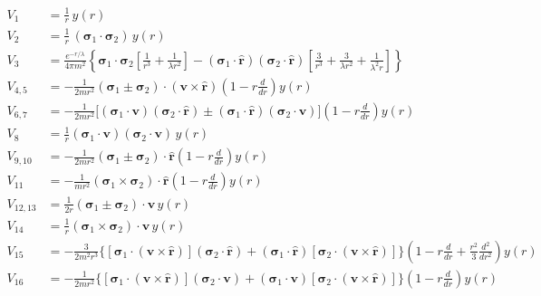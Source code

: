 {\small
\begin{align}
  V_1 &= \frac1r\,y(r) \label{eq:v1}\\
  V_2 &= \frac1r\,(\boldsymbol\sigma_1\cdot\boldsymbol\sigma_2)\,y(r) \label{eq:v2}\\
  V_3 &= \frac{e^{-r/\lambda}}{4\pi m^2}\left\{\boldsymbol\sigma_1\cdot\boldsymbol\sigma_2
    \left[\frac1{r^3}+\frac1{\lambda r^2}\right]
    -(\boldsymbol\sigma_1\cdot\hat{\mathbf r})(\boldsymbol\sigma_2\cdot\hat{\mathbf r})
    \left[\frac3{r^3}+\frac3{\lambda r^2}+\frac1{\lambda^2r}\right]\right\} \label{eq:v3}\\
  V_{4,5} &= -\frac{1}{2mr^2}(\boldsymbol\sigma_1\pm\boldsymbol\sigma_2)\cdot(\mathbf v\times\hat{\mathbf r})
    \left(1-r\frac{d}{dr}\right)y(r) \label{eq:v45}\\
  V_{6,7} &= -\frac{1}{2mr^2}\Big[(\boldsymbol\sigma_1\cdot\mathbf v)(\boldsymbol\sigma_2\cdot\hat{\mathbf r})
    \pm(\boldsymbol\sigma_1\cdot\hat{\mathbf r})(\boldsymbol\sigma_2\cdot\mathbf v)\Big]
    \left(1-r\frac{d}{dr}\right)y(r) \label{eq:v67}\\
  V_8 &= \frac1r(\boldsymbol\sigma_1\cdot\mathbf v)(\boldsymbol\sigma_2\cdot\mathbf v)\,y(r) \label{eq:v8}\\
  V_{9,10} &= -\frac{1}{2mr^2}(\boldsymbol\sigma_1\pm\boldsymbol\sigma_2)\cdot\hat{\mathbf r}
    \left(1-r\frac{d}{dr}\right)y(r) \label{eq:v910}\\
  V_{11} &= -\frac{1}{mr^2}(\boldsymbol\sigma_1\times\boldsymbol\sigma_2)\cdot\hat{\mathbf r}
    \left(1-r\frac{d}{dr}\right)y(r) \label{eq:v11}\\
  V_{12,13} &= \frac{1}{2r}(\boldsymbol\sigma_1\pm\boldsymbol\sigma_2)\cdot\mathbf v\,y(r) \label{eq:v1213}\\
  V_{14} &= \frac1r(\boldsymbol\sigma_1\times\boldsymbol\sigma_2)\cdot\mathbf v\,y(r) \label{eq:v14}\\
  V_{15} &= -\frac{3}{2m^2r^3}\Big\{[\boldsymbol\sigma_1\cdot(\mathbf v\times\hat{\mathbf r})](\boldsymbol\sigma_2\cdot\hat{\mathbf r})
    +(\boldsymbol\sigma_1\cdot\hat{\mathbf r})[\boldsymbol\sigma_2\cdot(\mathbf v\times\hat{\mathbf r})]\Big\}
    \left(1-r\frac{d}{dr}+\frac{r^2}{3}\frac{d^2}{dr^2}\right)y(r) \label{eq:v15}\\
  V_{16} &= -\frac{1}{2mr^2}\Big\{[\boldsymbol\sigma_1\cdot(\mathbf v\times\hat{\mathbf r})](\boldsymbol\sigma_2\cdot\mathbf v)
    +(\boldsymbol\sigma_1\cdot\mathbf v)[\boldsymbol\sigma_2\cdot(\mathbf v\times\hat{\mathbf r})]\Big\}
    \left(1-r\frac{d}{dr}\right)y(r) \label{eq:v16}
\end{align}
}

